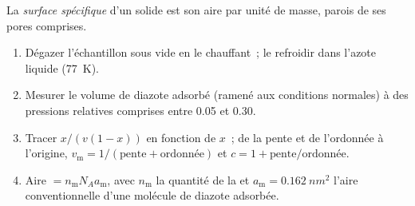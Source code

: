 \begin{definition}\label{def:b3:surfaces-catalysis:surface-area}
La \emph{surface spécifique} d'un solide est son aire
par unité de masse, parois de ses pores comprises.
\end{definition}

\begin{method}\label{met:b3:surfaces-catalysis:bet-area}
\begin{enumerate}
  \item Dégazer l'échantillon sous vide en le chauffant~; le refroidir
        dans l'azote liquide
        (\qty{77}{K}).
  \item Mesurer le volume de diazote adsorbé (ramené aux conditions
        normales) à des pressions relatives comprises entre 0.05 et 0.30.
  \item Tracer $x/(v(1 - x))$ en fonction de $x$~; de la pente et de
        l'ordonnée à l'origine,
        $v_{\mathrm m} = 1/(\text{pente} + \text{ordonnée})$ et $c = 1 + \text{pente}/\text{ordonnée}$.
  \item Aire $= n_{\mathrm m}N_Aa_{\mathrm m}$, avec $n_{\mathrm m}$ la
        quantité de la  et $a_{\mathrm m} = \qty{0.162}{nm^2}$
        l'aire conventionnelle d'une molécule de diazote adsorbée.
\end{enumerate}
\end{method}

